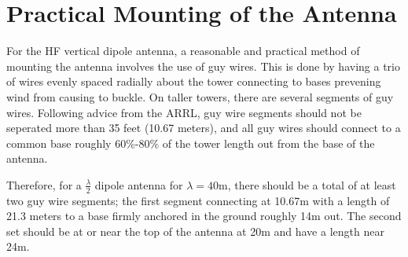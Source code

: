 \section{Practical Mounting of the Antenna}

For the HF vertical dipole antenna, a reasonable and practical method of mounting
the antenna involves the use of guy wires. This is done by having a trio of
wires evenly spaced radially about the tower connecting to bases prevening wind from causing to
buckle. On taller towers, there are several segments of guy wires. Following
advice from the ARRL, guy wire segments should not be seperated more than 35
feet (10.67 meters), and all guy wires should connect to a common base roughly
60\%-80\% of the tower length out from the base of the antenna. \cite{antbook}

Therefore, for a $\frac{\lambda}{2}$ dipole antenna for $\lambda=40$m, there
should be a total of at least two guy wire segments; the first segment
connecting at 10.67m with a length of 21.3 meters to a base firmly anchored in
the ground roughly 14m out. The second set should be at or near the top of the antenna at 20m
and have a length near 24m.
